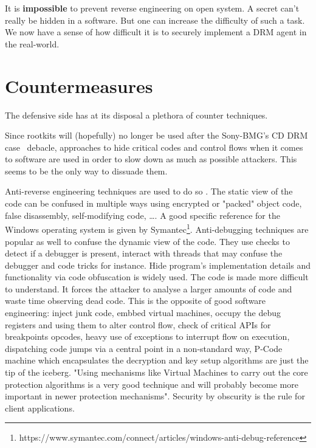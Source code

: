 \documentclass[11pt, twocolumn]{article}
\begin{document}
It is \textbf{impossible} to prevent reverse engineering on open system.
A secret can't really be hidden in a software.
But one can increase the difficulty of such a task.
We now have a sense of how difficult it is to securely implement a DRM agent in the real-world.

\section{Countermeasures}

The defensive side has at its disposal a plethora of counter techniques.

Since rootkits will (hopefully) no longer be used after the Sony-BMG's CD DRM case~\cite{Halderman:2006} debacle, approaches to hide critical codes and control flows when it comes to software are used in order to slow down as much as possible attackers.
This seems to be the only way to dissuade them.

Anti-reverse engineering techniques are used to do so \cite{Newger:2016}.
The static view of the code can be confused in multiple ways using encrypted or "packed" object code, false disassembly, self-modifying code, \dots.
A good specific reference for the Windows operating system is given by Symantec\footnote{https://www.symantec.com/connect/articles/windows-anti-debug-reference}.
Anti-debugging techniques are popular as well to confuse the dynamic view of the code.
They use checks to detect if a debugger is present, interact with threads that may confuse the debugger and code tricks for instance.
Hide program's implementation details and functionality via code obfuscation is widely used.
The code is made more difficult to understand.
It forces the attacker to analyse a larger amounts of code and waste time observing dead code.
This is the opposite of good software engineering: inject junk code, embbed virtual machines, occupy the debug registers and using them to alter control flow, check of critical APIs for breakpoints opcodes, heavy use of exceptions to interrupt flow on execution, dispatching code jumps via a central point in a non-standard way, P-Code machine which encapsulates the decryption and key setup algorithms are just the tip of the iceberg.
"Using mechanisms like Virtual Machines to carry out the core protection algorithms is a very good technique and will probably become more important in newer protection mechanisms"\cite{Newger:2016}.
Security by obscurity is the rule for client applications.
\end{document}
